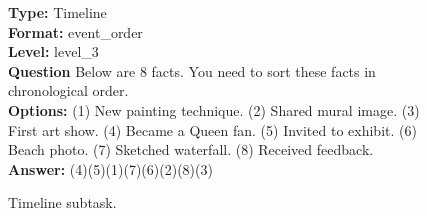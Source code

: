 \documentclass{article} %
\begin{document}
\begin{figure}[htbp]
\begin{tcolorbox}[
colframe=black!75!white, 
colback=white, sharp corners, 
boxrule=0.8pt, width=\textwidth,
title=Timeline
] 
\textbf{Type:} Timeline \\
\textbf{Format:} event\_order \\
\textbf{Level:} level\_3 \\
\textbf{Question} Below are 8 facts. You need to sort these facts in chronological order. \\
\textbf{Options:} (1) New painting technique. (2) Shared mural image. (3) First art show. (4) Became a Queen fan. (5) Invited to exhibit. (6) Beach photo. (7) Sketched waterfall. (8) Received feedback. \\
\textbf{Answer:} (4)(5)(1)(7)(6)(2)(8)(3)
\end{tcolorbox} 
\caption{Timeline subtask.}
\label{fig:timeline}
\end{figure}
\end{document}
